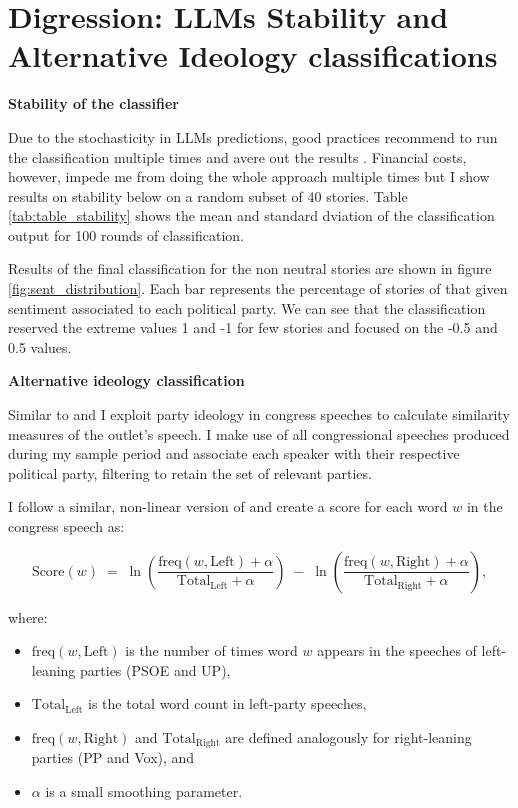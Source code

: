\documentclass[12pt]{article}
\begin{document}
\section{ Digression: LLMs Stability and Alternative Ideology classifications }
	\label{sec:sent_stability}
	
	
	\textbf{Stability of the classifier}
	
	Due to the stochasticity in LLMs predictions, good practices recommend to run the classification multiple times and avere out the results \citep{tornberg2023}. Financial costs, however, impede me from doing the whole approach multiple times but I show results on stability below on a random subset of  40 stories. Table \ref{tab:table_stability} shows the mean and standard dviation of the classification output for 100 rounds of classification. 
	
	Results of the final classification for the non neutral stories are shown in figure \ref{fig:sent_distribution}. Each bar represents the percentage of stories of that given sentiment associated to each political party. We can see that the classification reserved the extreme values 1 and -1 for few stories and focused on the -0.5 and 0.5 values. 
	
	
	
	
	\textbf{Alternative ideology classification}
	
	
Similar to \cite{gentzkow2010media} and \cite{laver2003extracting} I exploit party ideology in congress speeches to calculate similarity measures of the outlet's speech. I make use of all congressional speeches produced during my sample period and associate each speaker with their respective political party, filtering to retain the set of relevant parties.

I follow a similar, non-linear version of \cite{laver2003extracting} and create a score for each word $w$ in the congress speech as: 


	
	\begin{equation}
		\text{Score}(w) \;=\; \ln \left( \frac{\mathrm{freq}(w,\text{Left}) + \alpha}{\mathrm{Total}_{\text{Left}} + \alpha} \right) \;-\; \ln \left( \frac{\mathrm{freq}(w,\text{Right}) + \alpha}{\mathrm{Total}_{\text{Right}} + \alpha} \right),
		\label{eq:log_ratio}
	\end{equation}
	
	where:
	\begin{itemize}
		\item $\mathrm{freq}(w,\text{Left})$ is the number of times word $w$ appears in the speeches of left-leaning parties (PSOE and UP),
		\item $\mathrm{Total}_{\text{Left}}$ is the total word count in left-party speeches,
		\item $\mathrm{freq}(w,\text{Right})$ and $\mathrm{Total}_{\text{Right}}$ are defined analogously for right-leaning parties (PP and Vox), and
		\item $\alpha$ is a small smoothing parameter.
		
	\end{itemize}
	
\end{document}
